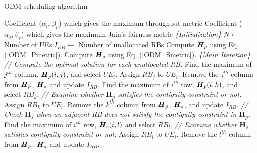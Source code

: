 \begin{algorithm}[H]
  \caption{ ODM scheduling algorithm}
  \label{alg:ODM}
  \begin{algorithmic}[1]  
    \Require
    \Statex Coefficient ($\alpha_p,\beta_p$) which gives the maximum throughput metric  
    \Statex	Coefficient ($\alpha_s,\beta_s$) which gives the maximum Jain's fairness metric
    \Statex \textit{\{Initialization\}}  
    \State $N \leftarrow$ Number of UEs
    \State $I_{RB} \leftarrow$ Number of unallocated RBs
    \State Compute $\textbf{\textit{H}}_p$ using Eq. (\ref{ODM_Pmetric}).
    \State Compute $\textbf{\textit{H}}_s$ using Eq. (\ref{ODM_Smetric}).
    \Statex \textit{\{Main Iteration\}}
    \Statex \textit{// Compute the optimal solution for each unallocated RB.}
    	\State Find the maximum of $j^{th}$ column, $\textbf{\textit{H}}_p(i,j)$, and select $UE_i$.
    		\State Assign $RB_j$ to $UE_i$.
    		\State Remove the $j^{th}$ column from $\textbf{\textit{H}}_p$, $\textbf{\textit{H}}_s$ and update $I_{RB}$.
    	\EndIf
    	\State Find the maximum of $i^{th}$ row, $\textbf{\textit{H}}_p(i,k)$, and select $RB_k$.
    	\Statex \quad\enskip \textit{// Examine whether $\textbf{H}_p$ satisfies the contiguity constraint or not.}
    	\State Assign $RB_k$ to $UE_i$.
    	\State Remove the $k^{th}$ column from $\textbf{\textit{H}}_p$, $\textbf{\textit{H}}_s$, and update $I_{RB}$.
    	\Statex \quad\enskip\textit{// Check $\textbf{H}_s$ when an adjacent RB does not satisfy the contiguity constraint in $\textbf{H}_p$.}
    		\State Find the maximum of $i^{th}$ row, $\textbf{\textit{H}}_s(i,l)$ and select $RB_l$.
    		\Statex \qquad\enskip\enskip \textit{// Examine whether $\textbf{H}_s$  satisfies contiguity constraint or not.}	
    		\State Assign $RB_l$ to $UE_i$.
    		\State Remove the $l^{th}$ column from $\textbf{\textit{H}}_p$, $\textbf{\textit{H}}_s$ and update $I_{RB}$.
    		\EndIf
    	\EndIf
    \EndFor
  \end{algorithmic}
\end{algorithm}